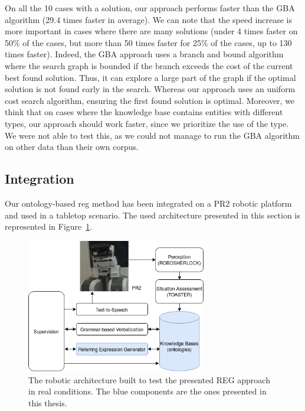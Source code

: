 \documentclass[a4paper,11pt,twoside]{StyleThese}
\begin{document}
On all the 10 cases with a solution, our approach performs faster than the GBA algorithm (29.4 times faster in average). We can note that the speed increase is more important in cases where there are many solutions (under 4 times faster on 50\% of the cases, but more than 50 times faster for 25\% of the cases, up to 130 times faster). 
Indeed, the GBA approach uses a branch and bound algorithm where the search graph is bounded if the branch exceeds the cost of the current best found solution. Thus, it can explore a large part of the graph if the optimal solution is not found early in the search. Whereas our approach uses an uniform cost search algorithm, ensuring the first found solution is optimal.
Moreover, we think that on cases where the knowledge base contains entities with different types, our approach should work faster, since we prioritize the use of the type. We were not able to test this, as we could not manage to run the GBA algorithm on other data than their own corpus.

\subsection{Integration}

Our ontology-based \acrshort{reg} method has been integrated on a PR2 robotic platform and used in a tabletop scenario. The used architecture presented in this section is represented in Figure~\ref{fig:regarchi}.

\begin{figure}[hbtp]
\centering
\includegraphics[width=0.7\textwidth]{figures/chapter3/ArchiREG.png}
\caption{The robotic architecture built to test the presented REG approach in real conditions. The blue components are the ones presented in this thesis.}
\label{fig:regarchi}
\end{figure}
\end{document}
